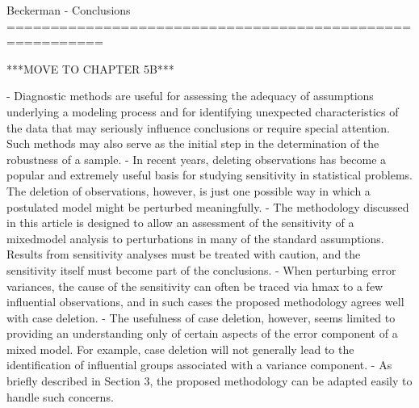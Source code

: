 Beckerman - Conclusions
=========================================================

***MOVE TO CHAPTER 5B***

- Diagnostic methods are useful for assessing the
adequacy of assumptions underlying a modeling process
and for identifying unexpected characteristics of
the data that may seriously influence conclusions or
require special attention. Such methods may also
serve as the initial step in the determination of the
robustness of a sample.
- In recent years, deleting observations has become
a popular and extremely useful basis for studying
sensitivity in statistical problems. The deletion of observations,
however, is just one possible way in which
a postulated model might be perturbed meaningfully.
- The methodology discussed in this article is designed
to allow an assessment of the sensitivity of a mixedmodel
analysis to perturbations in many of the standard
assumptions. Results from sensitivity analyses
must be treated with caution, and the sensitivity itself
must become part of the conclusions. 
- When perturbing error variances, the cause of the sensitivity
can often be traced via hmax to a few influential observations,
and in such cases the proposed methodology
agrees well with case deletion. 
- The usefulness of case
deletion, however, seems limited to providing an understanding
only of certain aspects of the error component
of a mixed model. For example, case deletion
will not generally lead to the identification of influential
groups associated with a variance component. 
- As
briefly described in Section 3, the proposed methodology
can be adapted easily to handle such concerns.

